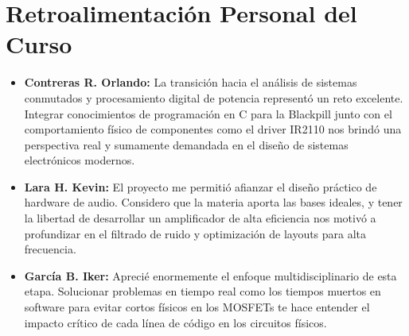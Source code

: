 \documentclass[pdflatex,sn-mathphys-num]{sn-jnl}%
\begin{document}
\section{Retroalimentación Personal del Curso}\label{sec:retroalimentacion}
\begin{itemize}
    \item \textbf{Contreras R. Orlando:} 
    La transición hacia el análisis de sistemas conmutados y procesamiento digital de potencia representó un reto excelente. Integrar conocimientos de programación en C para la Blackpill junto con el comportamiento físico de componentes como el driver IR2110 nos brindó una perspectiva real y sumamente demandada en el diseño de sistemas electrónicos modernos.
    
    \item \textbf{Lara H. Kevin:} 
    El proyecto me permitió afianzar el diseño práctico de hardware de audio. Considero que la materia aporta las bases ideales, y tener la libertad de desarrollar un amplificador de alta eficiencia nos motivó a profundizar en el filtrado de ruido y optimización de layouts para alta frecuencia.
    
    \item \textbf{García B. Iker:} 
    Aprecié enormemente el enfoque multidisciplinario de esta etapa. Solucionar problemas en tiempo real como los tiempos muertos en software para evitar cortos físicos en los MOSFETs te hace entender el impacto crítico de cada línea de código en los circuitos físicos.
\end{itemize}
\end{document}
